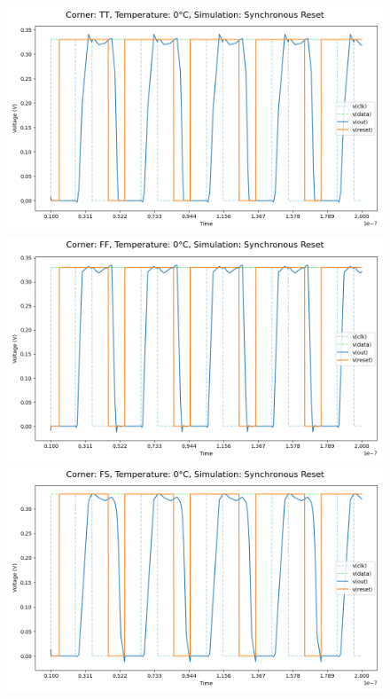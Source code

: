 \begin{figure}[H]
    \centering
    \includegraphics[height= 0.21\textheight]{figures/aimspice/TT/0/W3.csv.png}
    \vspace{5pt}
    \includegraphics[height= 0.21\textheight]{figures/aimspice/FF/0/W3.csv.png}
    \vspace{5pt}
    \includegraphics[height= 0.21\textheight]{figures/aimspice/FS/0/W3.csv.png}

\end{figure}
